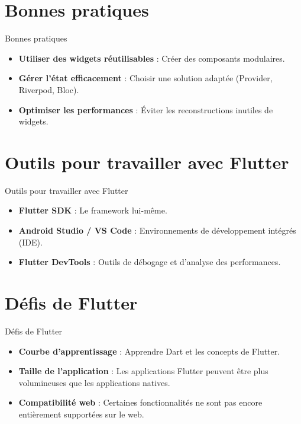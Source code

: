 \documentclass{clbeamer2024}
\begin{document}
		\section{Bonnes pratiques}
		\begin{frame}{Bonnes pratiques}
			\begin{itemize}
				\item \textbf{Utiliser des widgets réutilisables} : Créer des composants modulaires.
				\item \textbf{Gérer l'état efficacement} : Choisir une solution adaptée (Provider, Riverpod, Bloc).
				\item \textbf{Optimiser les performances} : Éviter les reconstructions inutiles de widgets.
			\end{itemize}
		\end{frame}
		
		
		\section{Outils pour travailler avec Flutter}
		\begin{frame}{Outils pour travailler avec Flutter}
			\begin{itemize}
				\item \textbf{Flutter SDK} : Le framework lui-même.
				\item \textbf{Android Studio / VS Code} : Environnements de développement intégrés (IDE).
				\item \textbf{Flutter DevTools} : Outils de débogage et d'analyse des performances.
			\end{itemize}
		\end{frame}

 \section{Défis de Flutter}
 \begin{frame}{Défis de Flutter}
 	\begin{itemize}
 		\item \textbf{Courbe d'apprentissage} : Apprendre Dart et les concepts de Flutter.
 		\item \textbf{Taille de l'application} : Les applications Flutter peuvent être plus volumineuses que les applications natives.
 		\item \textbf{Compatibilité web} : Certaines fonctionnalités ne sont pas encore entièrement supportées sur le web.
 	\end{itemize}
 \end{frame}
 
\end{document}
